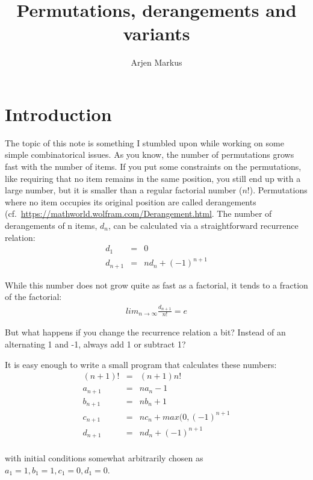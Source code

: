 \documentclass[onecolumn]{article}
\begin{document}
\title{Permutations, derangements and variants}

\author{Arjen Markus}

\maketitle

\section*{Introduction}
The topic of this note is something I stumbled upon while working on some simple combinatorical issues. As you know,
the number of permutations grows fast with the number of items. If you put some constraints on the permutations,
like requiring that no item remains in the same position, you still end up with a large number, but it is smaller
than a regular factorial number ($n!$). Permutations where no item occupies its original position are called
derangements (cf.\ \url{https://mathworld.wolfram.com/Derangement.html}. The number of derangements of n items, $d_n$, can be calculated via
a straightforward recurrence relation:
\begin{eqnarray}
\nonumber d_1     &=& 0 \\
\nonumber d_{n+1} &=& n d_n + (-1)^{n+1}
\end{eqnarray}

While this number does not grow quite as fast as a factorial, it tends to a fraction of the factorial:
\begin{eqnarray}
\nonumber lim_{n \rightarrow \infty} \frac{d_{n+1}}{n!} = e
\end{eqnarray}

But what happens if you change the recurrence relation a bit? Instead of an alternating 1 and -1, always add 1 or subtract 1?

It is easy enough to write a small program that calculates these numbers:
\begin{eqnarray}
\nonumber (n+1)!  &=& (n+1) n!           \\
\nonumber a_{n+1} &=& n a_n - 1          \\
\nonumber b_{n+1} &=& n b_n + 1          \\
\nonumber c_{n+1} &=& n c_n + max(0, (-1)^{n+1} \\
\nonumber d_{n+1} &=& n d_n + (-1)^{n+1} \\
\end{eqnarray}

\noindent with initial conditions somewhat arbitrarily chosen as $a_1 = 1, b_1 = 1, c_1 = 0, d_1 = 0$.
\end{document}
